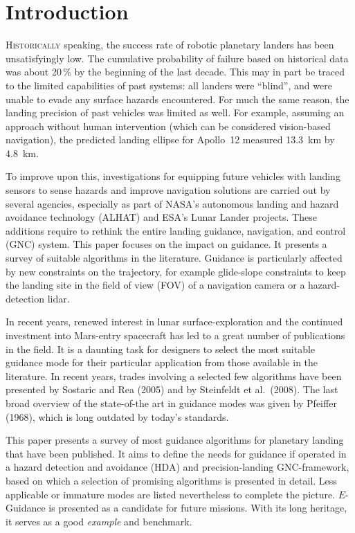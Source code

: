 \documentclass[%
]{aiaa-tc}
\begin{document}
\printnomenclature

\section{Introduction}

\lettrine{H}{\textsc{istorically}} speaking, the success rate of robotic
planetary landers has been unsatisfyingly low. The cumulative probability of
failure based on historical data was about 20\,\% by the beginning of the last
decade.\cite{Strandmoe1999} This may in part be traced to the limited
capabilities of past systems: all landers were ``blind'', and were unable to
evade any surface hazards encountered. For much the same reason, the landing
precision of past vehicles was limited as well. For example, assuming an approach
without human intervention (which can be considered vision-based navigation), the
predicted landing ellipse for Apollo~12 measured \SI{13.3}{km} by
\SI{4.8}{km}.\cite{Bennett1970} 

To improve upon this, investigations for equipping future vehicles with landing
sensors to sense hazards and improve navigation solutions are carried out by
several agencies, especially as part of NASA's autonomous landing and hazard
avoidance technology (ALHAT) and ESA's Lunar Lander
projects.\cite{Epp2007,Rosa2011} These additions require to rethink the entire
landing guidance, navigation, and control (GNC) system. This paper focuses on
the impact on guidance. It presents a survey of suitable algorithms in the
literature.  Guidance is particularly affected by new constraints on the
trajectory, for example glide-slope constraints to keep the landing site in the
field of view (FOV) of a navigation camera or a hazard-detection lidar.

In recent years, renewed interest in lunar surface-exploration and the continued
investment into Mars-entry spacecraft has led to a great number of publications
in the field. It is a daunting task for designers to select the most suitable
guidance mode for their particular application from those available in the
literature.  In recent years, trades involving a selected few algorithms have
been presented by Sostaric and Rea (2005)\cite{Sostaric2005} and by Steinfeldt
et al.\ (2008).\cite{Steinfeldt2008} The last broad overview of the state-of-the
art in guidance modes was given by Pfeiffer (1968),\cite{Pfeiffer1968} which is
long outdated by today's standards. 

This paper presents a survey of most guidance algorithms for planetary landing
that have been published. It aims to define the needs for guidance if operated
in a hazard detection and avoidance (HDA) and precision-landing GNC-framework,
based on which a selection of promising algorithms is presented in detail. Less
applicable or immature modes are listed nevertheless to complete the picture.
$E$-Guidance is presented as a candidate for future missions. With its long
heritage, it serves as a good \emph{example} and benchmark.
\end{document}
